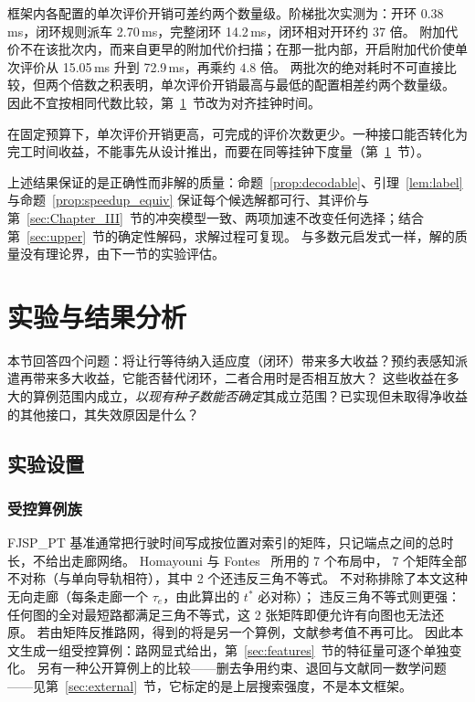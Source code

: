 \documentclass[manuscript,screen,review]{acmart}
\newcommand{\MsOpen}{0.38}
\newcommand{\MsLoopRule}{2.70}
\newcommand{\MsLoopProbe}{14.2}
\newcommand{\MsPriced}{72.9}
\newcommand{\MsPricedRef}{15.05}         %
\newcommand{\PubNLayout}{7}
\newcommand{\PubNLayoutAsym}{7}           %
\newcommand{\PubNLayoutBad}{2}            %
\begin{document}
框架内各配置的单次评价开销可差约两个数量级。阶梯批次实测为：开环 \MsOpen{}\,ms，闭环规则派车 \MsLoopRule{}\,ms，完整闭环 \MsLoopProbe{}\,ms，闭环相对开环约 $37$ 倍。
附加代价不在该批次内，而来自更早的附加代价扫描；在那一批内部，开启附加代价使单次评价从 \MsPricedRef{}\,ms 升到 \MsPriced{}\,ms，再乘约 $4.8$ 倍。
两批次的绝对耗时不可直接比较，但两个倍数之积表明，单次评价开销最高与最低的配置相差约两个数量级。
因此不宜按相同代数比较，第~\ref{sec:Chapter_V}~节改为对齐挂钟时间。

在固定预算下，单次评价开销更高，可完成的评价次数更少。一种接口能否转化为完工时间收益，不能事先从设计推出，而要在同等挂钟下度量（第~\ref{sec:Chapter_V}~节）。

上述结果保证的是正确性而非解的质量：命题~\ref{prop:decodable}、引理~\ref{lem:label} 与命题~\ref{prop:speedup_equiv} 保证每个候选解都可行、其评价与第~\ref{sec:Chapter_III}~节的冲突模型一致、两项加速不改变任何选择；结合第~\ref{sec:upper}~节的确定性解码，求解过程可复现。
与多数元启发式一样，解的质量没有理论界，由下一节的实验评估。

\section{实验与结果分析}
\label{sec:Chapter_V}

本节回答四个问题：将让行等待纳入适应度（闭环）带来多大收益？预约表感知派遣再带来多大收益，它能否替代闭环，二者合用时是否相互放大？
这些收益在多大的算例范围内成立，\emph{以现有种子数能否确定}其成立范围？已实现但未取得净收益的其他接口，其失效原因是什么？

\subsection{实验设置}
\label{sec:instances}

\subsubsection{受控算例族}
FJSP\_PT 基准通常把行驶时间写成按位置对索引的矩阵，只记端点之间的总时长，不给出走廊网络。
Homayouni 与 Fontes~\cite{homayouni2021production} 所用的 \PubNLayout{} 个布局中，
\PubNLayoutAsym{} 个矩阵全部不对称（与单向导轨相符），其中 \PubNLayoutBad{} 个还违反三角不等式。
不对称排除了本文这种无向走廊（每条走廊一个 $\tau_e$，由此算出的 $t^{*}$ 必对称）；
违反三角不等式则更强：任何图的全对最短路都满足三角不等式，这 \PubNLayoutBad{} 张矩阵即便允许有向图也无法还原。
若由矩阵反推路网，得到的将是另一个算例，文献参考值不再可比。
因此本文生成一组受控算例：路网显式给出，第~\ref{sec:features}~节的特征量可逐个单独变化。
另有一种公开算例上的比较——删去争用约束、退回与文献同一数学问题——见第~\ref{sec:external}~节，它标定的是上层搜索强度，不是本文框架。
\end{document}
